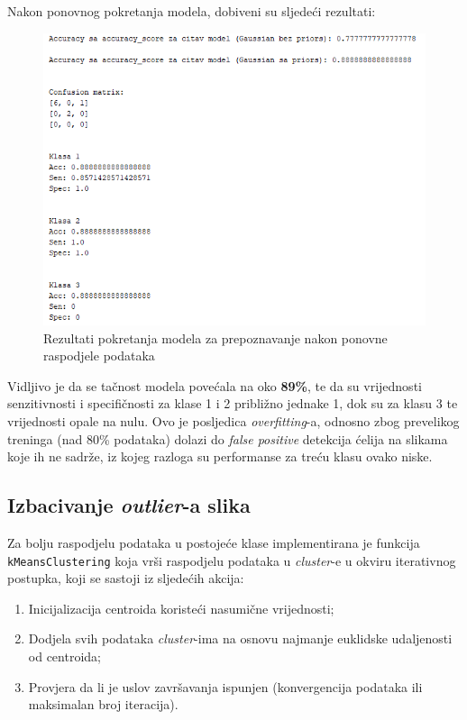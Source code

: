 \documentclass[12pt,a4paper]{article}
\begin{document}
Nakon ponovnog pokretanja modela, dobiveni su sljedeći rezultati:

\begin{figure}[H]

\center
\includegraphics[scale=0.9]{slikaDrukcijaRaspodjela.png}
\caption{Rezultati pokretanja modela za prepoznavanje nakon ponovne raspodjele podataka}
	
\end{figure}

Vidljivo je da se tačnost modela povećala na oko \textbf{89\%}, te da su vrijednosti senzitivnosti i specifičnosti za klase 1 i 2 približno jednake 1, dok su za klasu 3 te vrijednosti opale na nulu. Ovo je posljedica \textit{overfitting}-a, odnosno zbog prevelikog treninga (nad 80\% podataka) dolazi do \textit{false positive} detekcija ćelija na slikama koje ih ne sadrže, iz kojeg razloga su performanse za treću klasu ovako niske.

\subsection{Izbacivanje \textit{outlier}-a slika}

Za bolju raspodjelu podataka u postojeće klase implementirana je funkcija \texttt{kMeansClustering} koja vrši raspodjelu podataka u \textit{cluster}-e u okviru iterativnog postupka, koji se sastoji iz sljedećih akcija:

\begin{enumerate}

\item Inicijalizacija centroida koristeći nasumične vrijednosti;
\item Dodjela svih podataka \textit{cluster}-ima na osnovu najmanje euklidske udaljenosti od centroida;
\item Provjera da li je uslov završavanja ispunjen (konvergencija podataka ili maksimalan broj iteracija).

\end{enumerate}
\end{document}
